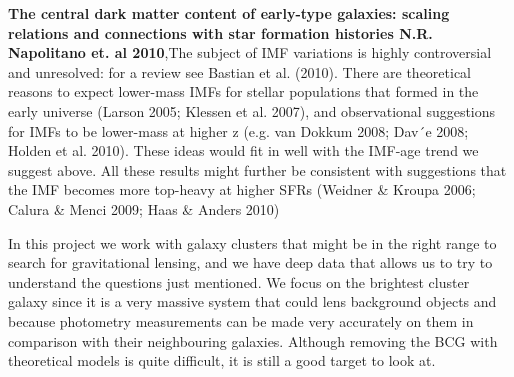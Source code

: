\textbf{The central dark matter content of early-type galaxies: scaling relations and connections with star formation histories N.R. Napolitano et. al 2010},The subject of IMF variations is highly controversial and unresolved: for a review see Bastian et al. (2010). There are theoretical reasons to expect lower-mass IMFs for stellar populations that formed in the early universe (Larson 2005; Klessen et al. 2007), and observational suggestions for IMFs to be lower-mass at higher z (e.g. van Dokkum 2008; Dav´e
2008; Holden et al. 2010). These ideas would fit in well with the IMF-age trend we suggest above. All these results might further be consistent with suggestions that the IMF becomes more top-heavy at higher SFRs (Weidner \& Kroupa 2006; Calura \& Menci 2009; Haas \& Anders 2010)

In this project we work with galaxy clusters that might be in the right range to search for gravitational lensing, and we have deep data that allows us to try to understand the questions just mentioned. We focus on the brightest cluster galaxy since it is a very massive system that could lens background objects and because photometry measurements can be made very accurately on them in comparison with their neighbouring galaxies. Although removing the BCG with theoretical models is quite difficult, it is still a good target to look at. 
   
\newpage
